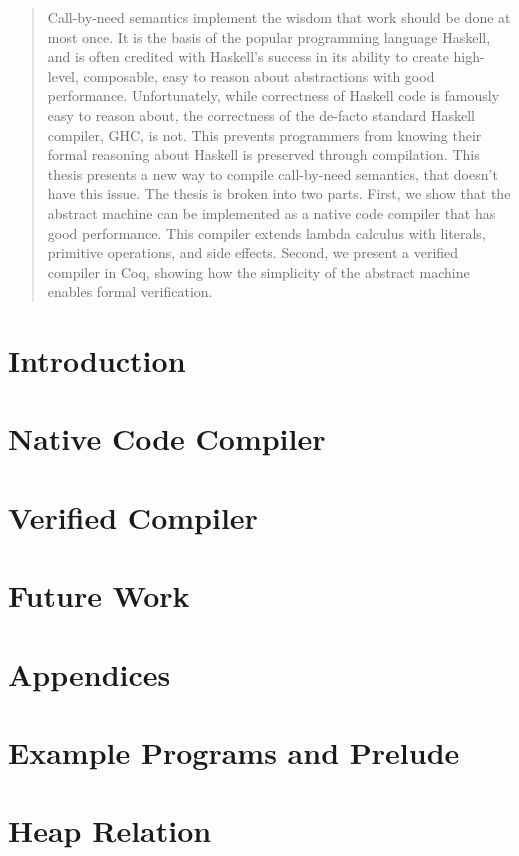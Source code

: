 \documentclass[botnum, fleqn]{unmeethesis}
\begin{document}
\begin{abstract}
Call-by-need semantics implement the wisdom that work should be done at most
once. It is the basis of the popular programming language Haskell, and is often
credited with Haskell's success in its ability to create high-level, composable,
easy to reason about abstractions with good performance. Unfortunately, while
correctness of Haskell code is famously easy to reason about, the correctness of
the de-facto standard Haskell compiler, GHC, is not. This prevents programmers
from knowing their formal reasoning about Haskell is preserved through
compilation. This thesis presents a new way to compile call-by-need semantics,
that doesn't have this issue. The thesis is broken into two parts. First, we
show that the abstract machine can be implemented as a native code compiler that
has good performance. This compiler extends lambda calculus with literals,
primitive operations, and side effects. Second, we present a verified compiler
in Coq, showing how the simplicity of the abstract machine enables formal
verification. 
\clearpage %
\end{abstract}

\tableofcontents
\listoffigures
\listoftables

\mainmatter

\chapter{Introduction}


\chapter{Native Code Compiler}











\chapter{Verified Compiler}










\chapter{Future Work}

\chapter*{Appendices}

\appendix
\chapter{Example Programs and Prelude}

\chapter{Heap Relation} 



\end{document}
